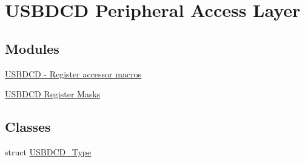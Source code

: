 \hypertarget{group__USBDCD__Peripheral__Access__Layer}{}\section{U\+S\+B\+D\+CD Peripheral Access Layer}
\label{group__USBDCD__Peripheral__Access__Layer}
\subsection*{Modules}
\begin{DoxyCompactItemize}
\item 
\hyperlink{group__USBDCD__Register__Accessor__Macros}{U\+S\+B\+D\+C\+D -\/ Register accessor macros}
\item 
\hyperlink{group__USBDCD__Register__Masks}{U\+S\+B\+D\+C\+D Register Masks}
\end{DoxyCompactItemize}
\subsection*{Classes}
\begin{DoxyCompactItemize}
\item 
struct \hyperlink{structUSBDCD__Type}{U\+S\+B\+D\+C\+D\+\_\+\+Type}
\end{DoxyCompactItemize}

